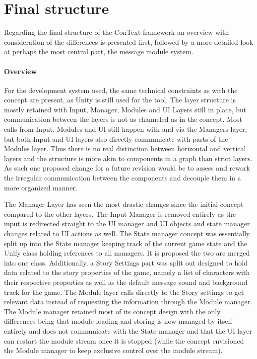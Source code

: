 \section{Final structure}
Regarding the final structure of the ConText framework an overview with consideration of the differences is presented first, followed by a more detailed look at perhaps the most central part, the message module system. 
\paragraph{Overview} For the development system used, the same technical constraints as with the concept are present, as Unity is still used for the tool. 
The layer structure is mostly retained with Input, Manager, Modules and UI Layers still in place, but communication between the layers is not as channeled as in the concept. Most calls from Input, Modules and UI still happen with and via the Managers layer, but both Input and UI layers also directly communicate with parts of the Modules layer. Thus there is no real distinction between horizontal and vertical layers and the structure is more akin to components in a graph than strict layers. As such one proposed change for a future revision would be to assess and rework the irregular communication between the components and decouple them in a more organized manner. 

The Manager Layer has seen the most drastic changes since the initial concept compared to the other layers. The Input Manager is removed entirely as the input is redirected straight to the UI manager and UI objects and state manager changes related to UI actions as well. The State manager concept was essentially split up into the State manager keeping track of the current game state and the Unify class holding references to all managers. It is proposed the two are merged into one class. Additionally, a Story Settings part was split out designed to hold data related to the story properties of the game, namely a list of characters with their respective properties as well as the default message sound and background track for the game. The Module layer calls directly to the Story settings to get relevant data instead of requesting the information through the Module manager. The Module manager retained most of its concept design with the only differences being that module loading and storing is now managed by itself entirely and does not communicate with the State manager and that the UI layer can restart the module stream once it is stopped (while the concept envisioned the Module manager to keep exclusive control over the module stream).


